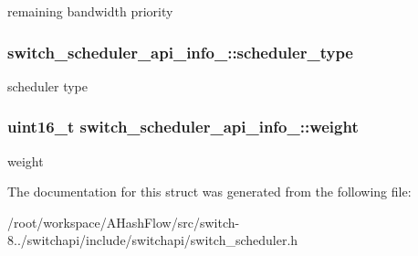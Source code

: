 remaining bandwidth priority \hypertarget{structswitch__scheduler__api__info___a324b02644e4e542c1fec4a539296cfb0}{
\subsubsection[{scheduler\+\_\+type}]{ switch\+\_\+scheduler\+\_\+api\+\_\+info\+\_\+\+::scheduler\+\_\+type}}\label{structswitch__scheduler__api__info___a324b02644e4e542c1fec4a539296cfb0}
scheduler type \hypertarget{structswitch__scheduler__api__info___a5fbeb37e26b1365f943cce012758cf00}{
\subsubsection[{weight}]{\setlength{\rightskip}{0pt plus 5cm}uint16\+\_\+t switch\+\_\+scheduler\+\_\+api\+\_\+info\+\_\+\+::weight}}\label{structswitch__scheduler__api__info___a5fbeb37e26b1365f943cce012758cf00}
weight 

The documentation for this struct was generated from the following file\+:\begin{DoxyCompactItemize}
\item 
/root/workspace/\+A\+Hash\+Flow/src/switch-\/8../switchapi/include/switchapi/switch\+\_\+scheduler.\+h\end{DoxyCompactItemize}
